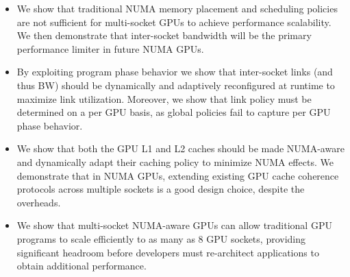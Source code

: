 \begin{itemize}
\vspace{-.05in}
\item We show that traditional NUMA memory placement and 
scheduling policies are not sufficient for multi-socket GPUs to achieve 
performance scalability. We then demonstrate that inter-socket bandwidth will be 
the primary performance limiter in future NUMA GPUs.
\vspace{-.05in}
\item By exploiting program phase behavior we show that inter-socket links (and 
thus BW) should be dynamically and adaptively reconfigured at runtime to maximize link 
utilization. Moreover, we show that link policy must be determined on a per 
GPU basis, as global policies fail to capture per GPU phase behavior.
\vspace{-.05in}
\item We show that both the GPU L1 and L2 caches should be made NUMA-aware 
and dynamically adapt their caching policy to minimize NUMA effects. We demonstrate
that in NUMA GPUs, extending existing GPU cache coherence protocols
across multiple sockets is a good design choice, despite the overheads.
\vspace{-.05in}
\item We show that multi-socket NUMA-aware GPUs can allow traditional 
GPU programs to scale efficiently to as many as 8 GPU sockets, providing significant 
headroom before developers must re-architect applications to obtain additional performance.

\end{itemize}
